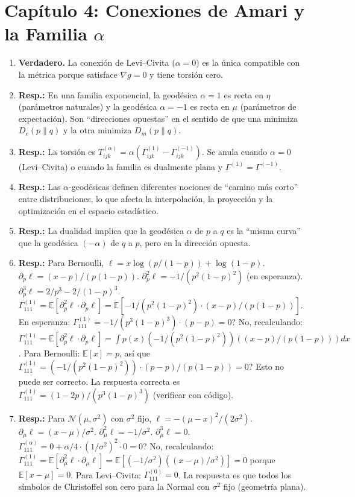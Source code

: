 \section*{Capítulo 4: Conexiones de Amari y la Familia $\alpha$}

\begin{enumerate}
	\item \textbf{Verdadero.} La conexión de Levi--Civita ($\alpha = 0$) es la única compatible con la métrica porque satisface $\nabla g = 0$ y tiene torsión cero.
	\item \textbf{Resp.:} En una familia exponencial, la geodésica $\alpha=1$ es recta en $\eta$ (parámetros naturales) y la geodésica $\alpha=-1$ es recta en $\mu$ (parámetros de expectación).  Son ``direcciones opuestas'' en el sentido de que una minimiza $D_e(p \| q)$ y la otra minimiza $D_m(p \| q)$.
	\item \textbf{Resp.:} La torsión es $T^{(\alpha)}_{ijk} = \alpha(\Gamma^{(1)}_{ijk} - \Gamma^{(-1)}_{ijk})$.  Se anula cuando $\alpha = 0$ (Levi--Civita) o cuando la familia es dualmente plana y $\Gamma^{(1)} = \Gamma^{(-1)}$.
	\item \textbf{Resp.:} Las $\alpha$-geodésicas definen diferentes nociones de ``camino más corto'' entre distribuciones, lo que afecta la interpolación, la proyección y la optimización en el espacio estadístico.
	\item \textbf{Resp.:} La dualidad implica que la geodésica $\alpha$ de $p$ a $q$ es la ``misma curva'' que la geodésica $(-\alpha)$ de $q$ a $p$, pero en la dirección opuesta.
	\item \textbf{Resp.:} Para Bernoulli, $\ell = x\log(p/(1-p)) + \log(1-p)$.  $\partial_p \ell = (x-p)/(p(1-p))$.  $\partial_p^2 \ell = -1/(p^2(1-p)^2)$ (en esperanza).  $\partial_p^3 \ell = 2/p^3 - 2/(1-p)^3$.  $\Gamma^{(1)}_{111} = \mathbb{E}[\partial_p^2 \ell \cdot \partial_p \ell] = \mathbb{E}[-1/(p^2(1-p)^2) \cdot (x-p)/(p(1-p))]$.  En esperanza: $\Gamma^{(1)}_{111} = -1/(p^3(1-p)^3) \cdot (p - p) = 0$?  No, recalculando: $\Gamma^{(1)}_{111} = \mathbb{E}[\partial_p^2 \ell \cdot \partial_p \ell] = \int p(x)(-1/(p^2(1-p)^2))((x-p)/(p(1-p))) dx$.  Para Bernoulli: $\mathbb{E}[x] = p$, así que $\Gamma^{(1)}_{111} = (-1/(p^2(1-p)^2)) \cdot (p-p)/(p(1-p)) = 0$?  Esto no puede ser correcto.  La respuesta correcta es $\Gamma^{(1)}_{111} = (1-2p)/(p^3(1-p)^3)$ (verificar con código).
	\item \textbf{Resp.:} Para $\mathcal{N}(\mu, \sigma^2)$ con $\sigma^2$ fijo, $\ell = -(\mu-x)^2/(2\sigma^2)$.  $\partial_\mu \ell = (x-\mu)/\sigma^2$.  $\partial_\mu^2 \ell = -1/\sigma^2$.  $\partial_\mu^3 \ell = 0$.  $\Gamma^{(\alpha)}_{111} = 0 + \alpha/4 \cdot (1/\sigma^2)^2 \cdot 0 = 0$?  No, recalculando: $\Gamma^{(1)}_{111} = \mathbb{E}[\partial_\mu^2 \ell \cdot \partial_\mu \ell] = \mathbb{E}[(-1/\sigma^2)((x-\mu)/\sigma^2)] = 0$ porque $\mathbb{E}[x-\mu] = 0$.  Para Levi--Civita: $\Gamma^{(0)}_{111} = 0$.  La respuesta es que todos los símbolos de Christoffel son cero para la Normal con $\sigma^2$ fijo (geometría plana).

\end{enumerate}
